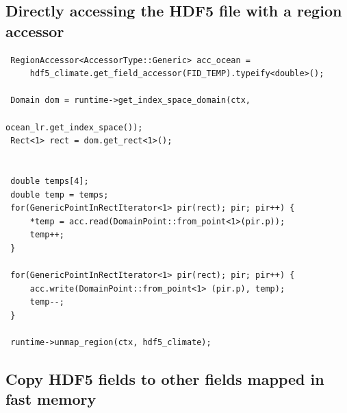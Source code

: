 \documentclass{article}
\begin{document}
 \subsection{Directly accessing the HDF5 file with a region accessor}
 \begin{lstlisting}
 RegionAccessor<AccessorType::Generic> acc_ocean =
     hdf5_climate.get_field_accessor(FID_TEMP).typeify<double>();
 
 Domain dom = runtime->get_index_space_domain(ctx,
                                              ocean_lr.get_index_space());
 Rect<1> rect = dom.get_rect<1>();
 
 
 double temps[4];
 double temp = temps;
 for(GenericPointInRectIterator<1> pir(rect); pir; pir++) { 
     *temp = acc.read(DomainPoint::from_point<1>(pir.p));
     temp++; 
 }
 
 for(GenericPointInRectIterator<1> pir(rect); pir; pir++) {
     acc.write(DomainPoint::from_point<1> (pir.p), temp);
     temp--;
 }
 
 runtime->unmap_region(ctx, hdf5_climate);
 \end{lstlisting}
 
 \subsection{Copy HDF5 fields to other fields mapped in fast memory}
 
\end{document}
